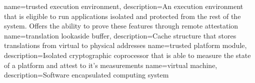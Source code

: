 {
    name=trusted execution environment,
    description={An execution environment that is eligible to run applications isolated and protected from the rest of
            the system. Offers the ability to prove these features through remote attestation}
}
{
    name=translation lookaside buffer,
    description={Cache structure that stores translations from virtual to physical addresses}
}
{
    name=trusted platform module,
    description={Isolated cryptographic coprocessor that is able to measure the state of a platform and attest to it's measurements}
}
%
{
    name=virtual machine,
    description={Software encapsulated computing system}
}
